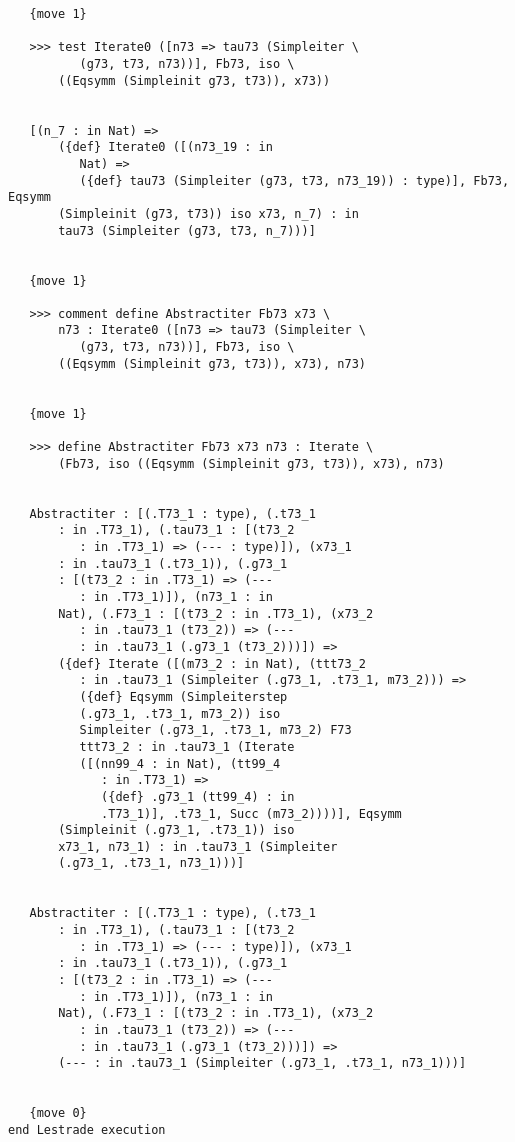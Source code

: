 \documentclass[12pt]{article}
\begin{document}
\begin{verbatim}
   {move 1}

   >>> test Iterate0 ([n73 => tau73 (Simpleiter \
          (g73, t73, n73))], Fb73, iso \
       ((Eqsymm (Simpleinit g73, t73)), x73))


   [(n_7 : in Nat) => 
       ({def} Iterate0 ([(n73_19 : in 
          Nat) => 
          ({def} tau73 (Simpleiter (g73, t73, n73_19)) : type)], Fb73, Eqsymm 
       (Simpleinit (g73, t73)) iso x73, n_7) : in 
       tau73 (Simpleiter (g73, t73, n_7)))]


   {move 1}

   >>> comment define Abstractiter Fb73 x73 \
       n73 : Iterate0 ([n73 => tau73 (Simpleiter \
          (g73, t73, n73))], Fb73, iso \
       ((Eqsymm (Simpleinit g73, t73)), x73), n73)


   {move 1}

   >>> define Abstractiter Fb73 x73 n73 : Iterate \
       (Fb73, iso ((Eqsymm (Simpleinit g73, t73)), x73), n73)


   Abstractiter : [(.T73_1 : type), (.t73_1 
       : in .T73_1), (.tau73_1 : [(t73_2 
          : in .T73_1) => (--- : type)]), (x73_1 
       : in .tau73_1 (.t73_1)), (.g73_1 
       : [(t73_2 : in .T73_1) => (--- 
          : in .T73_1)]), (n73_1 : in 
       Nat), (.F73_1 : [(t73_2 : in .T73_1), (x73_2 
          : in .tau73_1 (t73_2)) => (--- 
          : in .tau73_1 (.g73_1 (t73_2)))]) => 
       ({def} Iterate ([(m73_2 : in Nat), (ttt73_2 
          : in .tau73_1 (Simpleiter (.g73_1, .t73_1, m73_2))) => 
          ({def} Eqsymm (Simpleiterstep 
          (.g73_1, .t73_1, m73_2)) iso 
          Simpleiter (.g73_1, .t73_1, m73_2) F73 
          ttt73_2 : in .tau73_1 (Iterate 
          ([(nn99_4 : in Nat), (tt99_4 
             : in .T73_1) => 
             ({def} .g73_1 (tt99_4) : in 
             .T73_1)], .t73_1, Succ (m73_2))))], Eqsymm 
       (Simpleinit (.g73_1, .t73_1)) iso 
       x73_1, n73_1) : in .tau73_1 (Simpleiter 
       (.g73_1, .t73_1, n73_1)))]


   Abstractiter : [(.T73_1 : type), (.t73_1 
       : in .T73_1), (.tau73_1 : [(t73_2 
          : in .T73_1) => (--- : type)]), (x73_1 
       : in .tau73_1 (.t73_1)), (.g73_1 
       : [(t73_2 : in .T73_1) => (--- 
          : in .T73_1)]), (n73_1 : in 
       Nat), (.F73_1 : [(t73_2 : in .T73_1), (x73_2 
          : in .tau73_1 (t73_2)) => (--- 
          : in .tau73_1 (.g73_1 (t73_2)))]) => 
       (--- : in .tau73_1 (Simpleiter (.g73_1, .t73_1, n73_1)))]


   {move 0}
end Lestrade execution


\end{verbatim}
\end{document}
